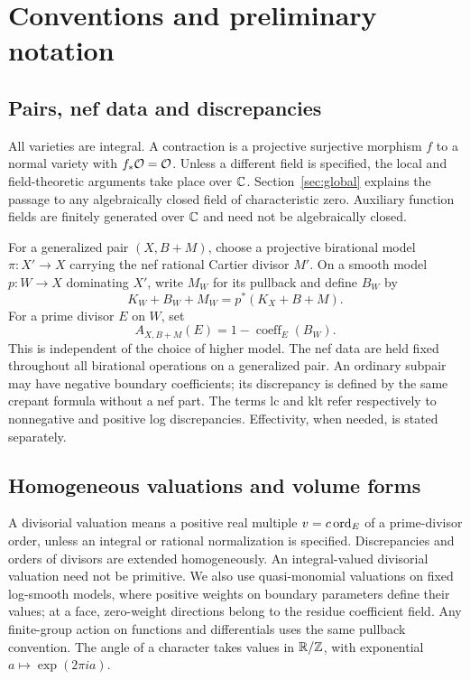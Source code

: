 \section{Conventions and preliminary notation}\label{sec:conventions}

\subsection{Pairs, nef data and discrepancies}

All varieties are integral. A contraction is a projective surjective
morphism $f$ to a normal variety with $f_*\mathcal O=\mathcal O$. Unless a different
field is specified, the local and field-theoretic arguments take place
over $\mathbb C$. Section~\ref{sec:global} explains the passage to any
algebraically closed field of characteristic zero. Auxiliary function
fields are finitely generated over $\mathbb C$ and need not be algebraically
closed.

For a generalized pair $(X,B+M)$, choose a projective birational model
$\pi\colon X'\to X$ carrying the nef rational Cartier divisor $M'$.
On a smooth model $p\colon W\to X$ dominating $X'$, write $M_W$ for
its pullback and define $B_W$ by
\[
 K_W+B_W+M_W=p^*(K_X+B+M).
\]
For a prime divisor $E$ on $W$, set
\[
 A_{X,B+M}(E)=1-\operatorname{coeff}_E(B_W).
\]
This is independent of the choice of higher model. The nef data are
held fixed throughout all birational operations on a generalized pair.
An ordinary subpair may have negative boundary coefficients; its
discrepancy is defined by the same crepant formula without a nef part.
The terms lc and klt refer respectively to nonnegative and positive
log discrepancies. Effectivity, when needed, is stated separately.

\subsection{Homogeneous valuations and volume forms}

A divisorial valuation means a positive real multiple
$v=c\operatorname{ord}_E$ of a prime-divisor order, unless an integral or rational
normalization is specified. Discrepancies and orders of divisors are
extended homogeneously. An integral-valued divisorial valuation need
not be primitive. We also use quasi-monomial valuations on fixed
log-smooth models, where positive weights on boundary parameters define
their values; at a face, zero-weight directions belong to the residue
coefficient field. Any finite-group action on functions and
differentials uses the same pullback convention. The angle of a
character takes values in $\mathbb R/\mathbb Z$, with exponential
$a\mapsto \exp(2\pi i a)$.

